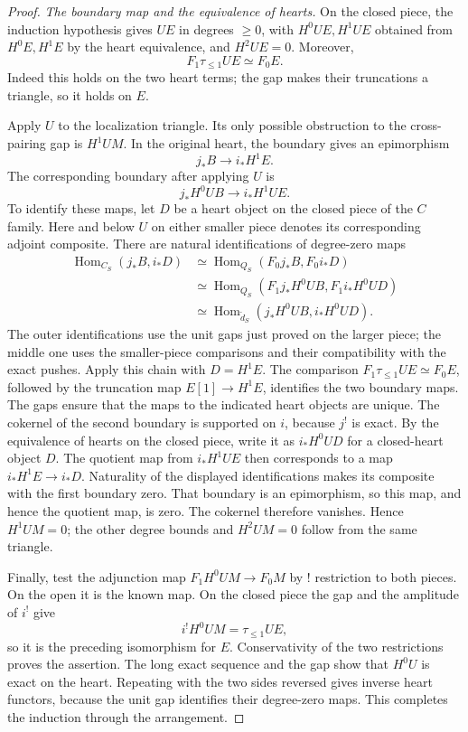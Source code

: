 \begin{proof}
\smallskip
\noindent\emph{The boundary map and the equivalence of hearts.}
On the closed piece, the induction hypothesis gives $UE$ in
degrees $\ge0$, with $H^0UE,H^1UE$ obtained from $H^0E,H^1E$
by the heart equivalence, and $H^2UE=0$.  Moreover,
\[
                        F_1\tau_{\le1}UE\simeq F_0E.
\]
Indeed this holds on the two heart terms; the gap makes their
truncations a triangle, so it holds on $E$.

Apply $U$ to the localization triangle.  Its only possible
obstruction to the cross-pairing gap is $H^1UM$.  In the original heart,
the boundary gives an epimorphism
\[
                    j_*B\longrightarrow i_*H^1E.
\]
The corresponding boundary after applying $U$ is
\[
                j_*H^0UB\longrightarrow i_*H^1UE.
\]
To identify these maps, let $D$ be a heart object on the closed
piece of the $C$ family.  Here and below $U$ on either smaller
piece denotes its corresponding adjoint composite.  There are
natural identifications of degree-zero maps
\[
\begin{aligned}
 \operatorname{Hom}_{C_S}(j_*B,i_*D)
 &\simeq \operatorname{Hom}_{Q_S}(F_0j_*B,F_0i_*D)\\
 &\simeq \operatorname{Hom}_{Q_S}
       (F_1j_*H^0UB,F_1i_*H^0UD)\\
 &\simeq \operatorname{Hom}_{\check d_S}
       (j_*H^0UB,i_*H^0UD).
\end{aligned}
\]
The outer identifications use the unit gaps just proved on the
larger piece; the middle one uses the smaller-piece comparisons
and their compatibility with the exact pushes.  Apply this chain
with $D=H^1E$.  The comparison
$F_1\tau_{\le1}UE\simeq F_0E$, followed by the truncation map
$E[1]\to H^1E$, identifies the two boundary maps.  The gaps
ensure that the maps to the indicated heart objects are unique.
The cokernel of the second boundary is supported on $i$, because
$j^!$ is exact.  By the equivalence of hearts on the closed piece,
write it as $i_*H^0UD$ for a closed-heart object $D$.  The quotient
map from $i_*H^1UE$ then corresponds to a map
$i_*H^1E\to i_*D$.  Naturality of the displayed identifications
makes its composite with the first boundary zero.  That boundary
is an epimorphism, so this map, and hence the quotient map, is zero.
The cokernel therefore vanishes.  Hence
$H^1UM=0$; the other degree bounds and $H^2UM=0$ follow from
the same triangle.

Finally, test the adjunction map $F_1H^0UM\to F_0M$ by !
restriction to both pieces.  On the open it is the known map.
On the closed piece the gap and the amplitude of $i^!$ give
\[
                         i^!H^0UM=\tau_{\le1}UE,
\]
so it is the preceding isomorphism for $E$.  Conservativity of
the two restrictions proves the assertion.  The long exact
sequence and the gap show that $H^0U$ is exact on the heart.
Repeating with the two sides reversed gives inverse heart
functors, because the unit gap identifies their degree-zero
maps.  This completes the induction through the arrangement.


\end{proof}
